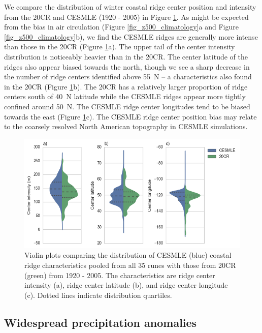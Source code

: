 \documentclass[final, double]{ua-thesis}
\begin{document}
We compare the distribution of winter coastal ridge center position and intensity from the 20CR and CESMLE (1920 - 2005) in Figure \ref{fig_ridge_violins}. As might be expected from the bias in air circulation (Figure \ref{fig_z500_climatology}a and Figure \ref{fig_z500_climatology}b), we find the CESMLE ridges are generally more intense than those in the 20CR (Figure \ref{fig_ridge_violins}a). The upper tail of the center intensity distribution is noticeably heavier than in the 20CR. The center latitude of the ridges also appear biased towards the north, though we see a sharp decrease in the number of ridge centers identified above 55\textdegree~N -- a characteristics also found in the 20CR (Figure \ref{fig_ridge_violins}b). The 20CR has a relatively larger proportion of ridge centers south of 40\textdegree~N latitude while the CESMLE ridges appear more tightly confined around 50\textdegree~N. The CESMLE ridge center longitudes tend to be biased towards the east (Figure \ref{fig_ridge_violins}c). The CESMLE ridge center position bias may relate to the coarsely resolved North American topography in CESMLE simulations.

\begin{figure}[ht]
\centering
\centerline{\includegraphics[width=6.5in]{p3figures/fig_ridge_violins.png}}
\caption{Violin plots comparing the distribution of CESMLE (blue) coastal ridge characteristics pooled from all 35 runes with those from 20CR (green) from 1920 - 2005. The characteristics are ridge center intensity (a), ridge center latitude (b), and ridge center longitude (c). Dotted lines indicate distribution quartiles.}
\label{fig_ridge_violins}
\end{figure}

\subsection{Widespread precipitation anomalies}
\end{document}
